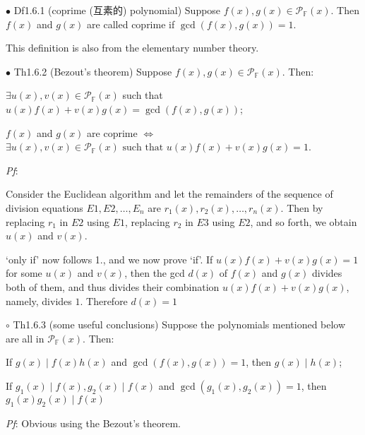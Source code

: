 \documentclass{article}
\begin{document}
\begin{Df}{$\bullet$ Df1.6.1 (coprime (互素的) polynomial)}
    Suppose $f(x), g(x)\in\mathcal{P}_\mathbb{F}(x)$. Then $f(x)$ and $g(x)$ are called coprime if $\gcd(f(x), g(x)) = 1$.
\end{Df}

\begin{Rmk}{}
    This definition is also from the elementary number theory.
\end{Rmk}

\begin{Th}{$\bullet$ Th1.6.2 (Bezout's theorem)}
    Suppose $f(x), g(x)\in\mathcal{P}_\mathbb{F}(x)$. Then:
    \begin{compactenum}
        \item $\exists u(x), v(x)\in \mathcal{P}_\mathbb{F}(x)$ such that $u(x)f(x)+v(x)g(x) = \gcd(f(x), g(x))$;
        \item $f(x)$ and $g(x)$ are coprime $\Leftrightarrow $ $\exists u(x), v(x)\in \mathcal{P}_\mathbb{F}(x) \text{ such that } u(x)f(x)+v(x)g(x) = 1$.
    \end{compactenum}
    \tcblower
    \textit{Pf}: \begin{compactenum}
        \item Consider the Euclidean algorithm and let the remainders of the sequence of division equations $E1, E2, \dots, E_n$ are $r_1(x), r_2(x), \dots, r_n(x)$. Then by replacing $r_1$ in $E2$ using $E1$, replacing $r_2$ in $E3$ using $E2$, and so forth, we obtain $u(x)$ and $v(x)$.
        \item `only if' now follows 1., and we now prove `if'. If $u(x)f(x)+v(x)g(x) = 1$ for some $u(x)$ and $v(x)$, then the gcd $d(x)$ of $f(x)$ and $g(x)$ divides both of them, and thus divides their combination $u(x)f(x)+v(x)g(x)$, namely, divides $1$. Therefore $d(x) = 1$
    \end{compactenum}
\end{Th}

\begin{Th}{$\circ$ Th1.6.3 (some useful conclusions)}
    Suppose the polynomials mentioned below are all in $\mathcal{P}_\mathbb{F}(x)$. Then:
    \begin{compactenum}
        \item If $g(x)\mid f(x)h(x)$ and $\gcd(f(x), g(x)) = 1$, then $g(x)\mid h(x)$;
        \item If $g_1(x)\mid f(x), g_2(x)\mid f(x)$ and $\gcd(g_1(x), g_2(x)) = 1$, then $g_1(x)g_2(x)\mid f(x)$
    \end{compactenum}
    \tcblower
    \textit{Pf}: Obvious using the Bezout's theorem.
\end{Th}
\end{document}
